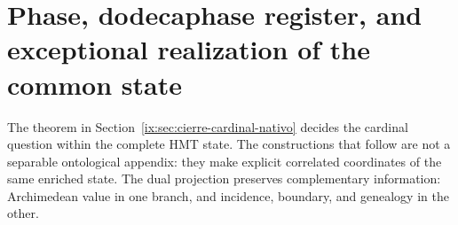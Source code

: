 \section{Phase, dodecaphase register, and exceptional realization of the common state}
\label{ix:sec:testigos-descendentes-ch}

The theorem in Section~\ref{ix:sec:cierre-cardinal-nativo} decides the cardinal
question within the complete HMT state. The constructions that follow are not
a separable ontological appendix: they make explicit correlated coordinates
of the same enriched state. The dual projection preserves complementary
information: Archimedean value in one branch, and incidence, boundary, and
genealogy in the other.

